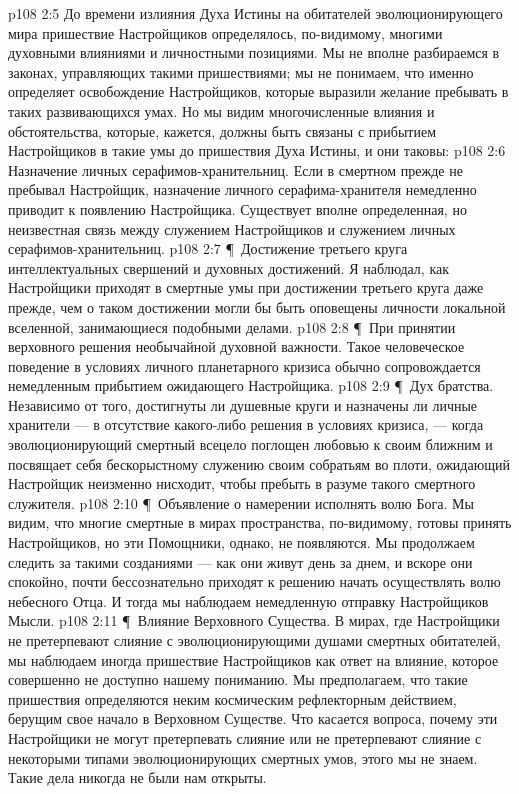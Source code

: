 \vs p108 2:5 До времени излияния Духа Истины на обитателей эволюционирующего мира пришествие Настройщиков определялось, по\hyp{}видимому, многими духовными влияниями и личностными позициями. Мы не вполне разбираемся в законах, управляющих такими пришествиями; мы не понимаем, что именно определяет освобождение Настройщиков, которые выразили желание пребывать в таких развивающихся умах. Но мы видим многочисленные влияния и обстоятельства, которые, кажется, должны быть связаны с прибытием Настройщиков в такие умы до пришествия Духа Истины, и они таковы:
\vs p108 2:6 \bibnobreakspace Назначение личных серафимов\hyp{}хранительниц. Если в смертном прежде не пребывал Настройщик, назначение личного серафима\hyp{}хранителя немедленно приводит к появлению Настройщика. Существует вполне определенная, но неизвестная связь между служением Настройщиков и служением личных серафимов\hyp{}хранительниц.
\vs p108 2:7 \P\ \bibnobreakspace Достижение третьего круга интеллектуальных свершений и духовных достижений. Я наблюдал, как Настройщики приходят в смертные умы при достижении третьего круга даже прежде, чем о таком достижении могли бы быть оповещены личности локальной вселенной, занимающиеся подобными делами.
\vs p108 2:8 \P\ \bibnobreakspace При принятии верховного решения необычайной духовной важности. Такое человеческое поведение в условиях личного планетарного кризиса обычно сопровождается немедленным прибытием ожидающего Настройщика.
\vs p108 2:9 \P\ \bibnobreakspace Дух братства. Независимо от того, достигнуты ли душевные круги и назначены ли личные хранители --- в отсутствие какого\hyp{}либо решения в условиях кризиса, --- когда эволюционирующий смертный всецело поглощен любовью к своим ближним и посвящает себя бескорыстному служению своим собратьям во плоти, ожидающий Настройщик неизменно нисходит, чтобы пребыть в разуме такого смертного служителя.
\vs p108 2:10 \P\ \bibnobreakspace Объявление о намерении исполнять волю Бога. Мы видим, что многие смертные в мирах пространства, по\hyp{}видимому, готовы принять Настройщиков, но эти Помощники, однако, не появляются. Мы продолжаем следить за такими созданиями --- как они живут день за днем, и вскоре они спокойно, почти бессознательно приходят к решению начать осуществлять волю небесного Отца. И тогда мы наблюдаем немедленную отправку Настройщиков Мысли.
\vs p108 2:11 \P\ \bibnobreakspace Влияние Верховного Существа. В мирах, где Настройщики не претерпевают слияние с эволюционирующими душами смертных обитателей, мы наблюдаем иногда пришествие Настройщиков как ответ на влияние, которое совершенно не доступно нашему пониманию. Мы предполагаем, что такие пришествия определяются неким космическим рефлекторным действием, берущим свое начало в Верховном Существе. Что касается вопроса, почему эти Настройщики не могут претерпевать слияние или не претерпевают слияние с некоторыми типами эволюционирующих смертных умов, этого мы не знаем. Такие дела никогда не были нам открыты.
